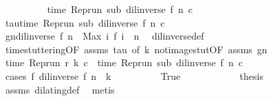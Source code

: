 \begin{isabellebody}
\ \ \ \ \ \ \isamarkupfalse%
\ {\isacharquery}{\isasymtau}\ {\isacharequal}\ {\isacartoucheopen}time\ {\isacharparenleft}Rep{\isacharunderscore}run\ sub\ {\isacharparenleft}{\isacharparenleft}dil{\isacharunderscore}inverse\ f{\isacharparenright}\ n{\isacharparenright}\ c{\isacharparenright}{\isacartoucheclose}\isanewline
\ \ \ \ \ \ \isamarkupfalse%
\ tau{\isacharcolon}{\isacartoucheopen}time\ {\isacharparenleft}Rep{\isacharunderscore}run\ sub\ {\isacharparenleft}{\isacharparenleft}dil{\isacharunderscore}inverse\ f{\isacharparenright}\ n{\isacharparenright}\ c{\isacharparenright}\ {\isacharequal}\ {\isacharquery}{\isasymtau}{\isacartoucheclose}\ \isacommand{{\isachardot}{\isachardot}}\isamarkupfalse%
\isanewline
\ \ \ \ \ \ \isamarkupfalse%
\ gn{\isacharcolon}{\isacartoucheopen}{\isacharparenleft}dil{\isacharunderscore}inverse\ f{\isacharparenright}\ n\ {\isacharequal}\ Max\ {\isacharbraceleft}i{\isachardot}\ f\ i\ {\isasymle}\ n{\isacharbraceright}{\isacartoucheclose}\ \isamarkupfalse%
\ dil{\isacharunderscore}inverse{\isacharunderscore}def\ \isacommand{{\isachardot}{\isachardot}}\isamarkupfalse%
\isanewline
\ \ \ \ \ \ \isamarkupfalse%
\ time{\isacharunderscore}stuttering{\isacharbrackleft}OF\ assms\ tau{\isacharcomma}\ of\ k{\isacharbrackright}\ not{\isacharunderscore}image{\isacharunderscore}stut{\isacharbrackleft}OF\ assms\ gn{\isacharbrackright}\isanewline
\ \ \ \ \ \ \isamarkupfalse%
\ {\isacartoucheopen}time\ {\isacharparenleft}{\isacharparenleft}Rep{\isacharunderscore}run\ r{\isacharparenright}\ k\ c{\isacharparenright}\ {\isacharequal}\ time\ {\isacharparenleft}{\isacharparenleft}Rep{\isacharunderscore}run\ sub{\isacharparenright}\ {\isacharparenleft}{\isacharparenleft}dil{\isacharunderscore}inverse\ f{\isacharparenright}\ n{\isacharparenright}\ c{\isacharparenright}{\isacartoucheclose}\isanewline
\ \ \ \ \ \ \isamarkupfalse%
\ {\isacharparenleft}cases\ {\isacartoucheopen}f\ {\isacharparenleft}{\isacharparenleft}dil{\isacharunderscore}inverse\ f{\isacharparenright}\ n{\isacharparenright}\ {\isacharequal}\ k{\isacartoucheclose}{\isacharparenright}\isanewline
\ \ \ \ \ \ \ \ \isamarkupfalse%
\ True\isanewline
\ \ \ \ \ \ \ \ \ \ \isamarkupfalse%
\ {\isacharquery}thesis\ \isamarkupfalse%
\ assms\ dilating{\isacharunderscore}def\ \isamarkupfalse%
\ metis\isanewline
\ \ \ \ \ \ \isamarkupfalse%
\isanewline
\ \ \ \ \ \ \ \ \isamarkupfalse%

\end{isabellebody}
